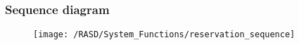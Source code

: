 \subsubsection{Sequence diagram}
\begin{figure}[!ht]
  \centering
  \vspace{0.2cm}
  \texttt{[image: /RASD/System\_Functions/reservation\_sequence]}\\
  \vspace{0.1cm}
  \label{fig:reservation_sequence} 
\end{figure}

